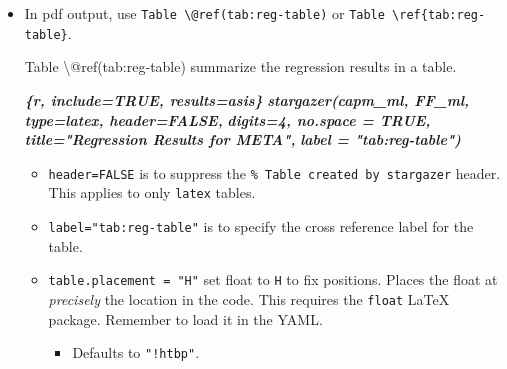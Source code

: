 \documentclass[
  a4paper,
  twoside,
  openright]{book}
\newenvironment{Shaded}{\begin{snugshade}}{\end{snugshade}}
\newcommand{\InformationTok}[1]{\textcolor[rgb]{0.56,0.35,0.01}{\textbf{\textit{#1}}}}
\newcommand{\NormalTok}[1]{#1}
\theoremstyle{definition}
\theoremstyle{definition}
\theoremstyle{definition}
\theoremstyle{definition}
\theoremstyle{remark}
\begin{document}
\begin{itemize}
\item
  {In pdf output}, use \texttt{Table\ \textbackslash{}@ref(tab:reg-table)} or \texttt{Table\ \textbackslash{}ref\{tab:reg-table\}}.

\begin{Shaded}
\begin{Highlighting}[]
\NormalTok{Table \textbackslash{}@ref(tab:reg{-}table) summarize the regression results in a table.}

\InformationTok{\textasciigrave{}\textasciigrave{}\textasciigrave{}\{r, include=TRUE, results=\textquotesingle{}asis\textquotesingle{}\}}
\InformationTok{stargazer(capm\_ml, FF\_ml, type=\textquotesingle{}latex\textquotesingle{}, header=FALSE,}
\InformationTok{          digits=4, no.space = TRUE,}
\InformationTok{          title="Regression Results for META",}
\InformationTok{          label = "tab:reg{-}table")}
\InformationTok{\textasciigrave{}\textasciigrave{}\textasciigrave{}}
\end{Highlighting}
\end{Shaded}

  \begin{itemize}
  \item
    {\texttt{header=FALSE}} is to suppress the \texttt{\%\ Table\ created\ by\ stargazer} header. This applies to only \texttt{latex} tables.
  \item
    \texttt{label="tab:reg-table"} is to specify the cross reference label for the table.
  \item
    {\texttt{table.placement\ =\ "H"}} set float to \texttt{H} to fix positions. Places the float at \emph{precisely} the location in the code. This requires the {\texttt{float}} LaTeX package. Remember to load it in the YAML.

    \begin{itemize}
    \item
      Defaults to \texttt{"!htbp"}.


\end{itemize}
\end{itemize}
\end{itemize}
\end{document}
